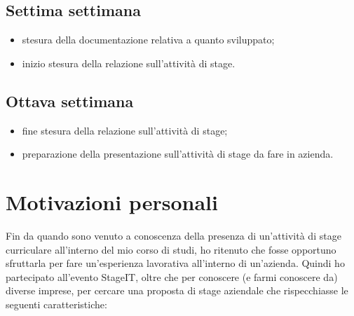 \subsection{Settima settimana} 
\begin{itemize}
	\item stesura della documentazione relativa a quanto sviluppato;
	\item inizio stesura della relazione sull'attività di stage.
\end{itemize}

\subsection{Ottava settimana} 
\begin{itemize}
	\item fine stesura della relazione sull'attività di stage;
	\item preparazione della presentazione sull'attività di stage da fare in azienda.
\end{itemize}

\section{Motivazioni personali}

Fin da quando sono venuto a conoscenza della presenza di un'attività di stage curriculare all'interno del mio corso di studi, ho ritenuto che fosse opportuno sfruttarla per fare un'esperienza lavorativa all'interno di un'azienda. Quindi ho partecipato all'evento StageIT, oltre che per conoscere (e farmi conoscere da) diverse imprese, per cercare una proposta di stage aziendale che rispecchiasse le seguenti caratteristiche:

